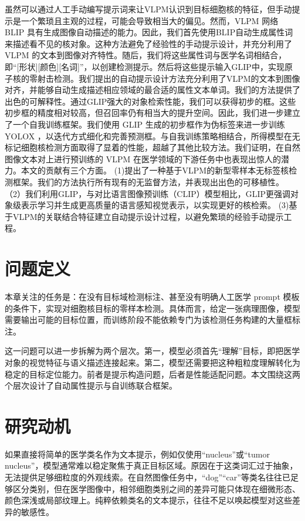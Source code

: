 虽然可以通过人工手动编写提示词来让VLPM认识到目标细胞核的特征，但手动提示是一个繁琐且主观的过程，可能会导致相当大的偏见。然而，VLPM 网络 BLIP \cite{li2022blip} 具有生成图像自动描述的能力。因此，我们首先使用BLIP自动生成属性词来描述看不见的核对象。这种方法避免了经验性的手动提示设计，并充分利用了 VLPM 的文本到图像对齐特性。随后，我们将这些属性词与医学名词相结合，即“[形状][颜色][名词]”，以创建检测提示。然后将这些提示输入GLIP中，实现原子核的零射击检测。我们提出的自动提示设计方法充分利用了VLPM的文本到图像对齐，并能够自动生成描述相应领域的最合适的属性文本单词。我们的方法提供了出色的可解释性。通过GLIP强大的对象检索性能，我们可以获得初步的框。这些初步框的精度相对较高，但召回率仍有相当大的提升空间。因此，我们进一步建立了一个自我训练框架。我们使用 GLIP 生成的初步框作为伪标签来进一步训练 YOLOX \cite{ge2021yolox}，以迭代方式细化和完善预测框。与自我训练策略相结合，所得模型在无标记细胞核检测方面取得了显着的性能，超越了其他比较方法。我们证明，在自然图像文本对上进行预训练的 VLPM 在医学领域的下游任务中也表现出惊人的潜力。本文的贡献有三个方面。 (1)提出了一种基于VLPM的新型零样本无标签核检测框架。我们的方法执行所有现有的无监督方法，并表现出出色的可移植性。 （2）我们利用GLIP，与对比语言图像预训练（CLIP）模型相比，GLIP更强调对象级表示学习并生成更高质量的语言感知视觉表示，以实现更好的核检索。 (3)基于VLPM的关联结合特征建立自动提示设计过程，以避免繁琐的经验手动提示工程。

\section{问题定义}

本章关注的任务是：在没有目标域检测标注、甚至没有明确人工医学 prompt 模板的条件下，实现对细胞核目标的零样本检测。具体而言，给定一张病理图像，模型需要输出可能的目标位置，而训练阶段不能依赖专门为该检测任务构建的大量框标注。

这一问题可以进一步拆解为两个层次。第一，模型必须首先“理解”目标，即把医学对象的视觉特征与语义描述连接起来。第二，模型还需要把这种粗粒度理解转化为稳定的目标定位能力。前者是提示构造问题，后者是性能适配问题。本文围绕这两个层次设计了自动属性提示与自训练联合框架。

\section{研究动机}
如果直接将简单的医学类名作为文本提示，例如仅使用“nucleus”或“tumor nucleus”，模型通常难以稳定聚焦于真正目标区域。原因在于这类词汇过于抽象，无法提供足够细粒度的外观线索。在自然图像任务中，“dog”“car”等类名往往已足够区分类别，但在医学图像中，相邻细胞类别之间的差异可能只体现在细微形态、颜色深浅或局部纹理上。纯粹依赖类名的文本提示，往往不足以唤起模型对这些差异的敏感性。

